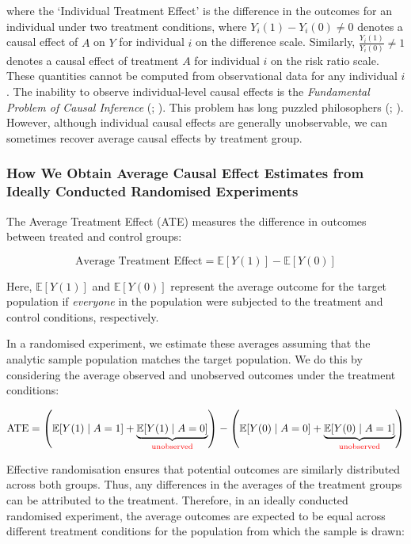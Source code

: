 \documentclass[
  single column]{article}
\begin{document}
where the `Individual Treatment Effect' is the difference in the
outcomes for an individual under two treatment conditions, where
\(Y_i(1) - Y_i(0) \neq 0\) denotes a causal effect of \(A\) on \(Y\) for
individual \(i\) on the difference scale. Similarly,
\(\frac{Y_i(1)}{Y_i(0)} \neq 1\) denotes a causal effect of treatment
\(A\) for individual \(i\) on the risk ratio scale. These quantities
cannot be computed from observational data for any individual \(i\). The
inability to observe individual-level causal effects is the
\emph{Fundamental Problem of Causal Inference}
(;
). This problem has long puzzled
philosophers (;
). However, although individual
causal effects are generally unobservable, we can sometimes recover
average causal effects by treatment group.

\subsubsection{How We Obtain Average Causal Effect Estimates from
Ideally Conducted Randomised
Experiments}\label{how-we-obtain-average-causal-effect-estimates-from-ideally-conducted-randomised-experiments}

The Average Treatment Effect (ATE) measures the difference in outcomes
between treated and control groups:

\[
\text{Average Treatment Effect} = \mathbb{E}[Y(1)] - \mathbb{E}[Y(0)]
\]

Here, \(\mathbb{E}[Y(1)]\) and \(\mathbb{E}[Y(0)]\) represent the
average outcome for the target population if \emph{everyone} in the
population were subjected to the treatment and control conditions,
respectively.

In a randomised experiment, we estimate these averages assuming that the
analytic sample population matches the target population. We do this by
considering the average observed and unobserved outcomes under the
treatment conditions:

\[
\text{ATE} = \left(\mathbb{E}[Y(1) \mid A = 1] + \underbrace{\mathbb{E}[Y(1) \mid A = 0]}_{\textcolor{red}{\text{unobserved}}}\right) - \left(\mathbb{E}[Y(0) \mid A = 0] + \underbrace{\mathbb{E}[Y(0) \mid A = 1]}_{\textcolor{red}{\text{unobserved}}}\right)
\]

Effective randomisation ensures that potential outcomes are similarly
distributed across both groups. Thus, any differences in the averages of
the treatment groups can be attributed to the treatment. Therefore, in
an ideally conducted randomised experiment, the average outcomes are
expected to be equal across different treatment conditions for the
population from which the sample is drawn:
\end{document}

